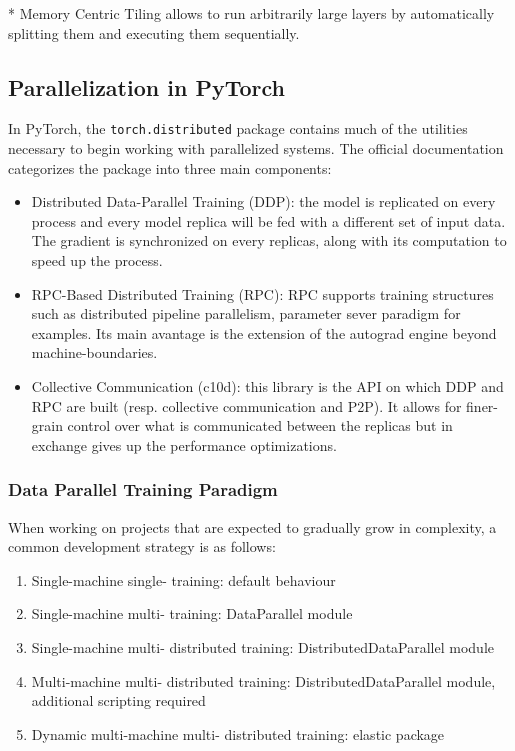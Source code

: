 \documentclass{article}
\begin{document}
* Memory Centric Tiling allows to run arbitrarily large layers by automatically splitting them and executing them sequentially.

\subsection{Parallelization in PyTorch}
In PyTorch, the \lstinline{torch.distributed} package contains much of the utilities necessary to begin working with parallelized systems. The official documentation categorizes the package into three main components:
\begin{itemize}
  \item Distributed Data-Parallel Training (DDP): the model is replicated on every process and every model replica will be fed with a different set of input data. The gradient is synchronized on every replicas, along with its computation to speed up the process.
  \item RPC-Based Distributed Training (RPC): RPC supports training structures such as distributed pipeline parallelism, parameter sever paradigm for examples. Its main avantage is the extension of the autograd engine beyond machine-boundaries.
  \item Collective Communication (c10d): this library is the API on which DDP and RPC are built (resp. collective communication and P2P). It allows for finer-grain control over what is communicated between the replicas but in exchange gives up the performance optimizations.
\end{itemize}

\subsubsection{Data Parallel Training Paradigm}
When working on projects that are expected to gradually grow in complexity, a common development strategy is as follows:
\begin{enumerate}
  \item Single-machine single- training: default behaviour
  \item Single-machine multi- training: DataParallel module
  \item Single-machine multi- distributed training: DistributedDataParallel module
  \item Multi-machine multi- distributed training: DistributedDataParallel module, additional scripting required
  \item Dynamic multi-machine multi- distributed training: elastic package
\end{enumerate}
\end{document}
